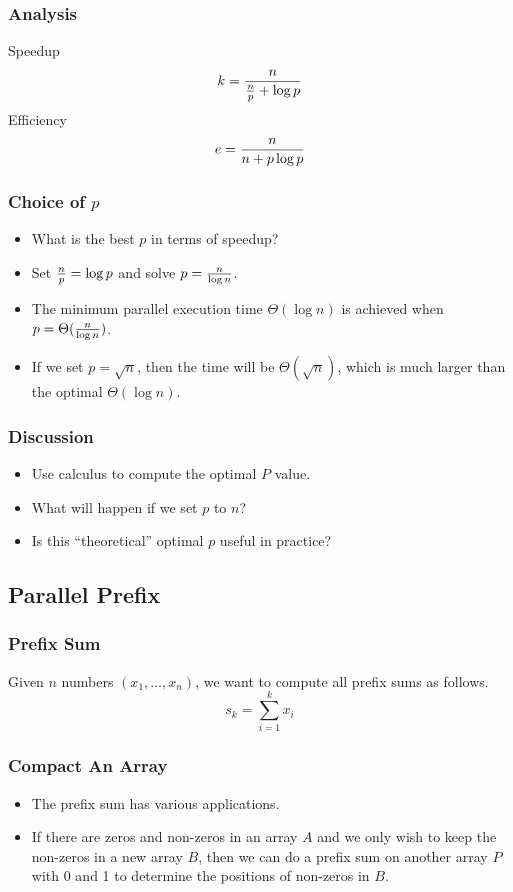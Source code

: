 \documentclass{beamer}
\begin{document}
\begin{CJK}{UTF8}{bsmi}
\begin{frame}
\frametitle{Analysis}
Speedup
\begin{equation}
k = {n \over {{n \over p} + \log p}}
\end{equation}
Efficiency
\begin{equation}
e = {n \over {{n + p \log p}}}
\end{equation}
\end{frame}

\begin{frame}
\frametitle{Choice of $p$}
\begin{itemize}
\item What is the best $p$ in terms of speedup?
\item Set ${n \over p} = \log p$ and solve $p = {n \over {\log n}}$.
\item The minimum parallel execution time $\Theta(\log n)$ is achieved
  when $p = \Theta({n \over {\log n}})$.
\item If we set $p = \sqrt n$, then the time will be $\Theta(\sqrt
  n)$, which is much larger than the optimal $\Theta(\log n)$.
\end{itemize}
\end{frame}

\begin{frame}
\frametitle{Discussion}
\begin{itemize}
\item Use calculus to compute the optimal $P$ value.
\item What will happen if we set $p$ to $n$?
\item Is this ``theoretical'' optimal $p$ useful in practice?
\end{itemize}
\end{frame}

\subsection{Parallel Prefix}

\begin{frame}
\frametitle{Prefix Sum} Given $n$ numbers $(x_1, \ldots, x_n)$, we
want to compute all prefix sums as follows.
\begin{equation}
s_k = \sum_{i = 1}^k x_i
\end{equation}
\end{frame}

\begin{frame}
\frametitle{Compact An Array}
\begin{itemize}
\item The prefix sum has various applications.
\item If there are zeros and non-zeros in an array $A$ and we only
  wish to keep the non-zeros in a new array $B$, then we can do a
  prefix sum on another array $P$ with 0 and 1 to determine the
  positions of non-zeros in $B$.
\end{itemize}
\end{frame}


\end{CJK}
\end{document}
